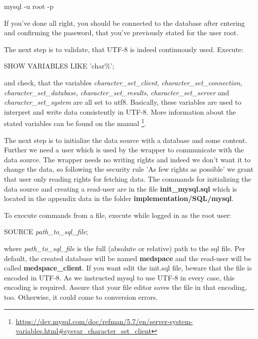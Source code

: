 \begin{codebox}
	mysql -u root -p 
\end{codebox}

If you've done all right, you should be connected to the database after entering and confirming the password, that you've previously stated for the user root.

The next step is to validate, that UTF-8 is indeed continuously used. Execute:

\begin{codebox}
	SHOW VARIABLES LIKE 'char\%';
\end{codebox}

and check, that the variables \emph{character\_set\_client}, \emph{character\_set\_connection}, \emph{character\_set\_database}, \emph{character\_set\_results}, \emph{character\_set\_server} and \emph{character\_set\_system} are all set to utf8.
Basically, these variables are used to interpret and write data consistently in UTF-8. More information about the stated variables can be found on the manual
\footnote{\url{https://dev.mysql.com/doc/refman/5.7/en/server-system-variables.html\#sysvar_character_set_client}}.

The next step is to initialize the data source with a database and some content. Further we need a user which is used by the wrapper to communicate with the data source. The wrapper needs no writing rights and indeed we don't want it to change the data, so following the security rule 'As few rights as possible' we grant that user only reading rights for fetching data. The commands for initializing the data source and creating a read-user are in the file \textbf{init\_mysql.sql} which is located in the appendix data in the folder \textbf{implementation/SQL/mysql}.

To execute commands from a file, execute while logged in as the root user:

\begin{codebox}
	SOURCE \emph{path\_to\_sql\_file};
\end{codebox}

where \emph{path\_to\_sql\_file} is the full (absolute or relative) path to the sql file.
Per default, the created database will be named \textbf{medspace} and the read-user will be called \textbf{medspace\_client}. If you want edit the init.sql file, beware that the file is encoded in UTF-8. As we instructed mysql to use UTF-8 in every case, this encoding is required. Assure that your file editor saves the file in that encoding, too. Otherwise, it could come to conversion errors.


